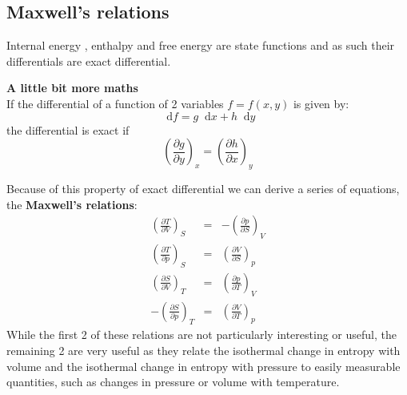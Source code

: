 \documentclass[12pt,a4paper]{report}
\newcommand*\diff{\mathop{}\!\mathrm{d}}
\begin{document}
   \subsection*{Maxwell's relations}
   Internal energy , enthalpy and free energy are state functions and as such their differentials  are exact differential.
   \begin{mdframed}
   \textbf{A little bit more maths}\\
   If the differential of a function of 2 variables  $f=f(x,y)$ is given by:
   \begin{equation*}
   \diff f= g \diff x + h \diff y
   \end{equation*}
   the differential is exact if 
   \begin{equation*}
   \left(\frac{\partial g}{\partial y}\right)_{x} = \left(\frac{\partial h}{\partial x}\right)_{y}
   \end{equation*}
   \end{mdframed}
   Because of this property of exact differential we can derive a series of equations, the \textbf{Maxwell's relations}:
   \begin{eqnarray*}
   \left(\frac{\partial T}{\partial V}\right)_{S}&=&-\left(\frac{\partial p}{\partial S}\right)_{V}\\ 
   \left(\frac{\partial T}{\partial p}\right)_{S}&=&\left(\frac{\partial V}{\partial S}\right)_{p}\\
   \left(\frac{\partial S}{\partial V}\right)_{T}&=&\left(\frac{\partial p}{\partial T}\right)_{V}\\
   -\left(\frac{\partial S}{\partial p}\right)_{T}&=&\left(\frac{\partial V}{\partial T}\right)_{p}
   \end{eqnarray*} 
   While the first 2 of these relations are not particularly interesting or useful, the remaining 2 are very useful as they relate the isothermal change in entropy with volume and the isothermal change in entropy with pressure to easily measurable quantities, such as changes in pressure or volume with temperature. 
\end{document}
